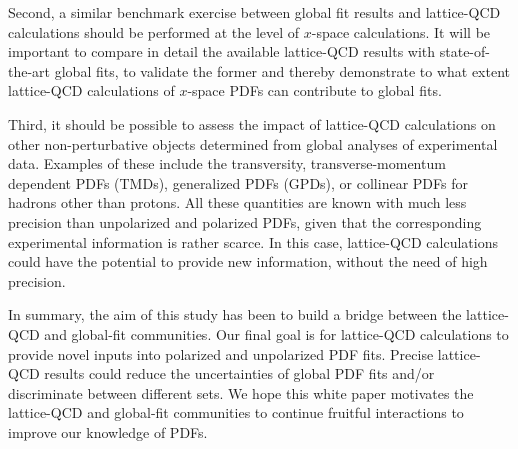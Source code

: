 Second, a similar benchmark exercise between global fit results and 
lattice-QCD calculations should be performed at the level of
$x$-space calculations.
%
It will be important to compare in detail the available lattice-QCD results 
with state-of-the-art global fits, to validate the former and
thereby demonstrate to what extent lattice-QCD calculations of $x$-space PDFs 
can contribute to global fits.

Third, it should be possible to assess the impact of lattice-QCD 
calculations on other non-perturbative objects
determined from global analyses of experimental data.
%
Examples of these include the transversity, transverse-momentum dependent 
PDFs (TMDs), generalized PDFs (GPDs), or collinear PDFs for hadrons 
other than protons.
%
All these quantities are known with much less precision than unpolarized
and polarized PDFs, given that the corresponding experimental information
is rather scarce. 
%
In this case, lattice-QCD calculations could have the potential
to provide new information, without the need of high precision.

In summary, the aim of this study has been to build a bridge between the 
lattice-QCD and global-fit communities.
%
Our final goal is for lattice-QCD calculations to provide novel inputs into 
polarized and unpolarized PDF fits. 
%
Precise lattice-QCD results could reduce the uncertainties of
global PDF fits and/or discriminate between different sets.
%
We hope this white paper motivates the lattice-QCD and global-fit
communities to continue fruitful interactions to improve our knowledge of PDFs.
